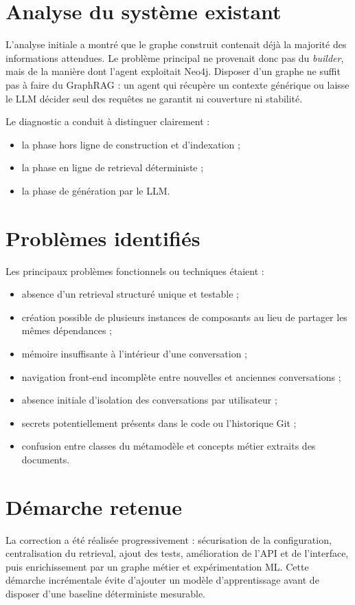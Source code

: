 \documentclass[12pt,a4paper,oneside]{report}
\begin{document}
\section{Analyse du système existant}
L'analyse initiale a montré que le graphe construit contenait déjà la majorité des informations attendues. Le problème principal ne provenait donc pas du \emph{builder}, mais de la manière dont l'agent exploitait Neo4j. Disposer d'un graphe ne suffit pas à faire du GraphRAG : un agent qui récupère un contexte générique ou laisse le LLM décider seul des requêtes ne garantit ni couverture ni stabilité.

Le diagnostic a conduit à distinguer clairement :
\begin{itemize}
  \item la phase hors ligne de construction et d'indexation ;
  \item la phase en ligne de retrieval déterministe ;
  \item la phase de génération par le LLM.
\end{itemize}

\section{Problèmes identifiés}
Les principaux problèmes fonctionnels ou techniques étaient :
\begin{itemize}
  \item absence d'un retrieval structuré unique et testable ;
  \item création possible de plusieurs instances de composants au lieu de partager les mêmes dépendances ;
  \item mémoire insuffisante à l'intérieur d'une conversation ;
  \item navigation front-end incomplète entre nouvelles et anciennes conversations ;
  \item absence initiale d'isolation des conversations par utilisateur ;
  \item secrets potentiellement présents dans le code ou l'historique Git ;
  \item confusion entre classes du métamodèle et concepts métier extraits des documents.
\end{itemize}

\section{Démarche retenue}
La correction a été réalisée progressivement : sécurisation de la configuration, centralisation du retrieval, ajout des tests, amélioration de l'API et de l'interface, puis enrichissement par un graphe métier et expérimentation ML. Cette démarche incrémentale évite d'ajouter un modèle d'apprentissage avant de disposer d'une baseline déterministe mesurable.
\end{document}
